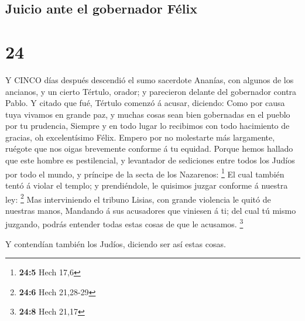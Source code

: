 \hypertarget{juicio-ante-el-gobernador-fuxe9lix}{%
\subsection{Juicio ante el gobernador
Félix}\label{juicio-ante-el-gobernador-fuxe9lix}}

\hypertarget{section-23}{%
\section{24}\label{section-23}}

 Y CINCO días después descendió el sumo sacerdote Ananías,
con algunos de los ancianos, y un cierto Tértulo, orador; y parecieron
delante del gobernador contra Pablo.  Y citado que fué,
Tértulo comenzó á acusar, diciendo: Como por causa tuya vivamos en
grande paz, y muchas cosas sean bien gobernadas en el pueblo por tu
prudencia,  Siempre y en todo lugar lo recibimos con todo
hacimiento de gracias, oh excelentísimo Félix.  Empero por
no molestarte más largamente, ruégote que nos oigas brevemente conforme
á tu equidad.  Porque hemos hallado que este hombre es
pestilencial, y levantador de sediciones entre todos los Judíos por todo
el mundo, y príncipe de la secta de los Nazarenos: \footnote{\textbf{24:5}
  Hech 17,6}  El cual también tentó á violar el templo; y
prendiéndole, le quisimos juzgar conforme á nuestra ley: \footnote{\textbf{24:6}
  Hech 21,28-29}  Mas interviniendo el tribuno Lisias, con
grande violencia le quitó de nuestras manos,  Mandando á sus
acusadores que viniesen á ti; del cual tú mismo juzgando, podrás
entender todas estas cosas de que le acusamos. \footnote{\textbf{24:8}
  Hech 21,17}

 Y contendían también los Judíos, diciendo ser así estas
cosas.

